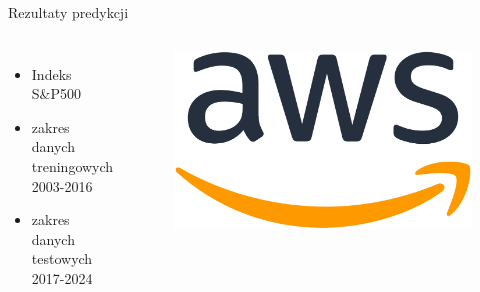 \begin{frame}{Rezultaty predykcji}
    \begin{columns}[t]
            \begin{itemize}
                \item Indeks S\&P500
                \item zakres danych treningowych 2003-2016
                \item zakres danych testowych 2017-2024
            \end{itemize}
        \centering
        \begin{figure}
            \centering
            \includegraphics[width=1\textwidth]{images/aws_logo.png}
        \end{figure}    
    \end{columns}
\end{frame}

